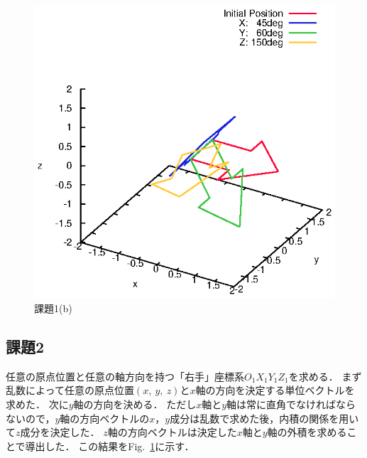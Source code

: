 \documentclass[a4paper,10pt]{jsarticle}
\begin{document}
\begin{figure}[p]
  \begin{center}
    \includegraphics[clip,width=14cm]{fig/eps/1(b).eps}
  \end{center}
  \caption{課題1(b)}
  \label{fig:課題1(b)}
\end{figure}

\subsection{課題2}
任意の原点位置と任意の軸方向を持つ「右手」座標系$O_1X_1Y_1Z_1$を求める．
まず乱数によって任意の原点位置$(x,\ y,\ z)$と$x$軸の方向を決定する単位ベクトルを求めた．
次に$y$軸の方向を決める．
ただし$x$軸と$y$軸は常に直角でなければならないので，$y$軸の方向ベクトルの$x$，$y$成分は乱数で求めた後，内積の関係を用いて$z$成分を決定した．
$z$軸の方向ベクトルは決定した$x$軸と$y$軸の外積を求めることで導出した．
この結果をFig.~\ref{fig:課題1(b)}に示す．
\end{document}
